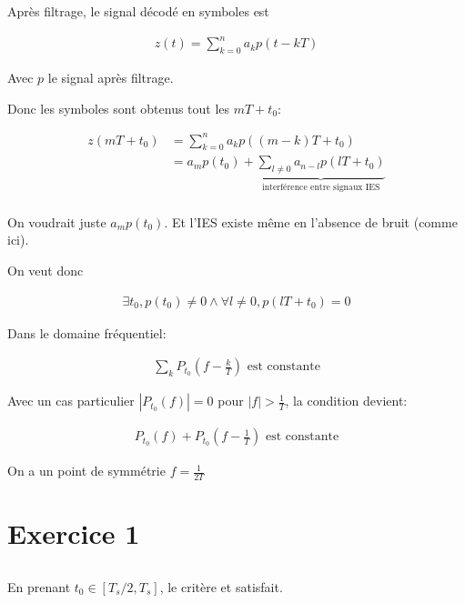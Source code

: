 \documentclass{article}
\begin{document}
    Après filtrage, le signal décodé en symboles est

    \begin{align*}
        z(t) = \sum_{k=0}^{n} a_k p(t-kT)
    \end{align*}

    Avec $p$ le signal après filtrage.

    Donc les symboles sont obtenus tout les $mT + t_0$:

    \begin{align*}
        z(mT+t_0) &= \sum_{k=0}^{n} a_k p((m-k)T+t_0) \\
                  &= a_m p(t_0) + \underbrace{\sum_{l\neq 0} a_{n-l} p(lT+t_0)}_{\text{interférence entre signaux IES}}  \\
    \end{align*}

    On voudrait juste $a_m p(t_0)$. Et l'IES existe même en l'absence de bruit (comme ici).

    On veut donc
\begin{theorem}


\begin{align*}
    \exists t_0, p(t_0) \neq  0 \land \forall l\neq 0, p(lT + t_0) = 0
\end{align*}
    \end{theorem}

    Dans le domaine fréquentiel:

    \begin{align*}
        \sum_{k} P_{t_0}(f-\frac{k}{T}) \text{   est constante} 
    \end{align*}

    Avec un cas particulier $|P_{t_0}(f)| = 0$ pour $|f| > \frac{1}{T}$, la condition devient:

    \begin{align*}
        P_{t_0}(f) + P_{t_0}(f - \frac{1}{T}) \text{   est constante}
    \end{align*}

    On a un point de symmétrie $f = \frac{1}{2T}$ 

\section{Exercice 1}
\subsection{}
En prenant $t_0\in [T_s/2, T_s]$, le critère et satisfait.
\end{document}
